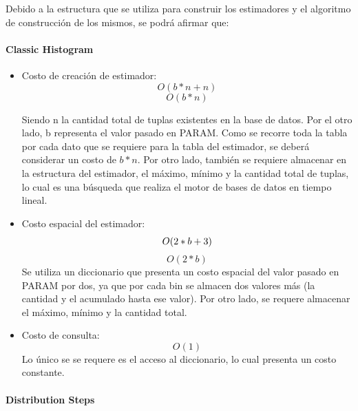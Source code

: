 \documentclass[10pt, a4paper,english,spanish,hidelinks]{article}
\begin{document}
Debido a la estructura que se utiliza para construir los estimadores y el algoritmo de construcción de los mismos, se podrá afirmar que:

\paragraph{Classic Histogram}
\begin{itemize}

\item Costo de creación de estimador:
\begin{equation}
O(b * n + n )
\end{equation}
\begin{equation}
O(b * n)
\end{equation}

Siendo n la cantidad total de tuplas existentes en la base de datos. Por el otro lado, b representa el valor pasado en PARAM. Como se recorre toda la tabla por cada dato que se requiere para la tabla del estimador, se deberá considerar un costo de $b * n$. Por otro lado, también se requiere almacenar en la estructura del estimador, el máximo, mínimo y la cantidad total de tuplas, lo cual es una búsqueda que realiza el motor de bases de datos en tiempo lineal.

\item Costo espacial del estimador:
\begin{equation}
O(2 * b + 3 ) \\
\end{equation}
\begin{equation}
O(2 * b)
\end{equation}
Se utiliza un diccionario que presenta un costo espacial del valor pasado en PARAM por dos, ya que por cada bin se almacen dos valores más (la cantidad y el acumulado hasta ese valor). Por otro lado, se requere almacenar el máximo, mínimo y la cantidad total.

\item Costo de consulta:
\begin{equation}
O(1)
\end{equation}
Lo único se se requere es el acceso al diccionario, lo cual presenta un costo constante.

\end{itemize}
\paragraph{Distribution Steps}
\end{document}
